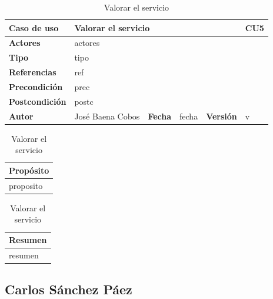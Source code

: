 \documentclass[12pt,spanish]{article}
\begin{document}
\begin{table}[H]
\centering
\begin{tabular}{|m{3cm}|m{4cm}|m{2cm}|m{2cm}|m{2cm}|m{1cm}|}
\hline
\textbf{Caso de uso} &  \multicolumn{4}{m{8cm}|}{Valorar el servicio} \vline &  \cellcolor{gray!40}CU5 \\
\hline
\textbf{Actores} & \multicolumn{5}{m{8cm}|}{actores} \\
\hline
\textbf{Tipo} & \multicolumn{5}{m{8cm}|}{tipo} \\
\hline
\textbf{Referencias} &\multicolumn{5}{m{8cm}|}{ref} \\
\hline
\textbf{Precondición} & \multicolumn{5}{m{8cm}|}{prec} \\
\hline
\textbf{Postcondición} & \multicolumn{5}{m{8cm}|}{postc} \\
\hline
\textbf{Autor} & José Baena Cobos & \textbf{Fecha} & fecha & \textbf{Versión} & v \\
\hline
\end{tabular}

\vspace{1cm}

\begin{tabular}{|m{16.2cm}|}
\hline
\textbf{Propósito} \\
\hline
proposito \\
\hline
\end{tabular}

\vspace{1cm}

\begin{tabular}{|m{16.2cm}|}
\hline
\textbf{Resumen} \\
\hline
resumen \\
\hline
\end{tabular}

\caption{Valorar el servicio}
\label{cu:5}
\end{table}


\subsection{Carlos Sánchez Páez}
\end{document}
